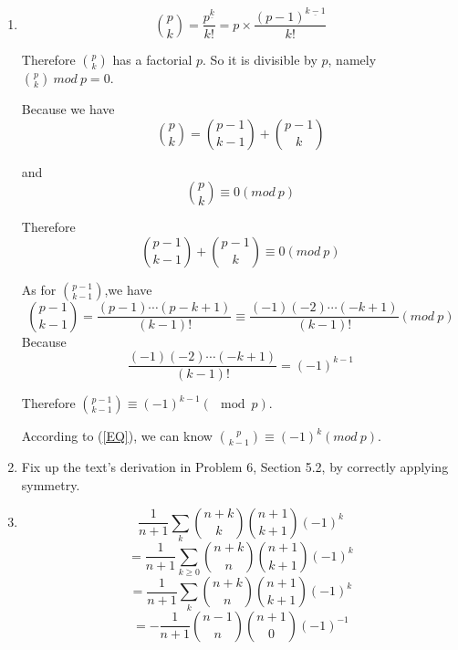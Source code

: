 \documentclass[12pt,a4paper]{article}
\makeatletter
\newtheorem*{solution}{Solution}
\theoremstyle{definition}
\renewenvironment{solution}[1][Solution] {\par\pushQED{\qed}\normalfont\topsep6\p@\@plus6\p@\relax\trivlist\item[\hskip\labelsep\bfseries#1\@addpunct{.}]\ignorespaces}{\popQED\endtrivlist\@endpefalse} \makeatother
\makeatother
\begin{document}
\begin{enumerate}
\begin{solution}
        	\begin{equation*}
        	\binom{p}{k}=\frac{p^{\underline{k}}}{k!}=p\times\frac{(p-1)^{\underline{k-1}}}{k!}        	
        	\end{equation*}
        	
        Therefore $\binom{p}{k}$ has a factorial $p$. So it is divisible by $p$, namely $\binom{p}{k}\ mod\ p=0$.
        
        Because we have
        \begin{equation*}
            \binom{p}{k}=\binom{p-1}{k-1}+\binom{p-1}{k}
        \end{equation*}
        
        and
        \begin{equation*}
            \binom{p}{k}\equiv 0(mod\ p)
        \end{equation*}
        
        Therefore
        \begin{equation}\label{EQ}
            \binom{p-1}{k-1}+\binom{p-1}{k}\equiv 0(mod\ p)
        \end{equation}
        
        As for $\binom{p-1}{k-1}$,we have
        \begin{equation*}
            \binom{p-1}{k-1}=\frac{(p-1)\cdots(p-k+1)}{(k-1)!}\equiv\frac{(-1)(-2)\cdots(-k+1)}{(k-1)!}(mod\ p)
        \end{equation*}
        Because
        \begin{equation*}
            \frac{(-1)(-2)\cdots(-k+1)}{(k-1)!}=(-1)^{k-1}
        \end{equation*}
        
        Therefore $\binom{p-1}{k-1}\equiv (-1)^{k-1}(\mod p)$.
        
        According to (\ref{EQ}), we can know $\binom{p}{k-1}\equiv (-1)^k(mod\ p)$.
    \end{solution}
    \item 
        Fix up the text's derivation in Problem 6, Section 5.2, by correctly applying symmetry.
        \begin{solution}
        	 \begin{equation*}
        	     \frac{1}{n+1} \sum_{k} \binom{n+k}{k} \binom{n+1}{k+1}(-1)^k
        	 \end{equation*}
        	 \begin{equation*}
        	     =\frac{1}{n+1} \sum_{k\ge 0} \binom{n+k}{n} \binom{n+1}{k+1}(-1)^k
        	 \end{equation*}
        	 \begin{equation*}
        	     =\frac{1}{n+1} \sum_{k} \binom{n+k}{n} \binom{n+1}{k+1}(-1)^k
        	 \end{equation*}
        	 \begin{equation*}
        	     =-\frac{1}{n+1} \binom{n-1}{n}\binom{n+1}{0}(-1)^{-1}
        	 \end{equation*}
        \end{solution}
\end{enumerate}

\end{document}
